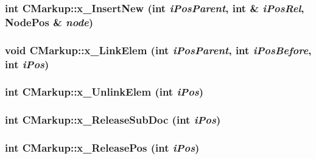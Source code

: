 \subsubsection[x\_\-InsertNew]{\setlength{\rightskip}{0pt plus 5cm}int CMarkup::x\_\-InsertNew (int {\em iPosParent}, \/  int \& {\em iPosRel}, \/  {\bf NodePos} \& {\em node})\hspace{0.3cm}{\tt  [protected]}}\label{classCMarkup_108530f8ed1d5b954109335556e752fc}


\subsubsection[x\_\-LinkElem]{\setlength{\rightskip}{0pt plus 5cm}void CMarkup::x\_\-LinkElem (int {\em iPosParent}, \/  int {\em iPosBefore}, \/  int {\em iPos})\hspace{0.3cm}{\tt  [protected]}}\label{classCMarkup_6840b6b96252adfc63ab6576f09b6ced}


\subsubsection[x\_\-UnlinkElem]{\setlength{\rightskip}{0pt plus 5cm}int CMarkup::x\_\-UnlinkElem (int {\em iPos})\hspace{0.3cm}{\tt  [protected]}}\label{classCMarkup_a730d3e5c3fae0cb214f9933889957f7}


\subsubsection[x\_\-ReleaseSubDoc]{\setlength{\rightskip}{0pt plus 5cm}int CMarkup::x\_\-ReleaseSubDoc (int {\em iPos})\hspace{0.3cm}{\tt  [protected]}}\label{classCMarkup_2cdb9e0924114a8b1274be02dc675a78}


\subsubsection[x\_\-ReleasePos]{\setlength{\rightskip}{0pt plus 5cm}int CMarkup::x\_\-ReleasePos (int {\em iPos})\hspace{0.3cm}{\tt  [protected]}}\label{classCMarkup_d468ae1a39272fca4e53588906267ff4}


